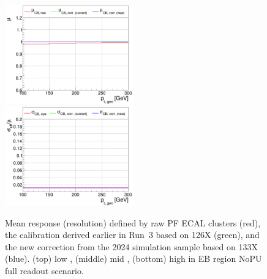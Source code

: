 \begin{figure}
\includegraphics[width=0.495\textwidth]{./plots_pdf/ECAL_plots/plotsNOPU/EB/FULL/pdf/GENPT/EBFULL_GENPT_0100_0300_MuOverBins.pdf}
\includegraphics[width=0.495\textwidth]{./plots_pdf/ECAL_plots/plotsNOPU/EB/FULL/pdf/GENPT/EBFULL_GENPT_0100_0300_EffSigmaOverBins.pdf}

\caption [$\mu$ ($\sigma_\mathrm{eff}$) vs. \pt of PF ECAL cluster - EB full readout NoPU scenario.]{Mean response (resolution) defined by raw PF ECAL clusters (red), the calibration derived earlier in Run~3 based on 126X (green), and the new correction from the 2024 simulation sample based on 133X (blue). (top) low \pt, (middle) mid \pt, (bottom) high \pt in EB region NoPU full readout scenario.}
\label{fig:NOPU_EBFULL_pt}
\end{figure}





